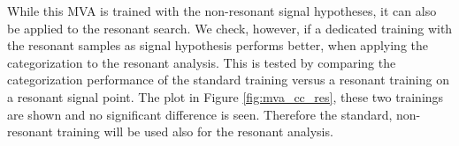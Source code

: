 While this MVA is trained with the non-resonant signal hypotheses, it can also be applied to the resonant search. 
We check, however, if a dedicated training with the resonant samples as signal hypothesis performs better, when applying the categorization to the resonant analysis.  
This is tested by comparing the categorization performance of the standard training versus a resonant training on a resonant signal point. 
The plot in Figure \ref{fig:mva_cc_res}, these two trainings are shown and no significant difference is seen. 
Therefore the standard, non-resonant training will be used also for the resonant analysis. 




